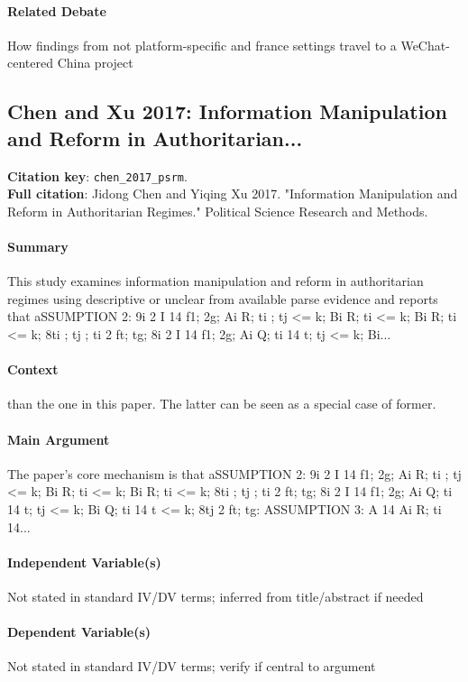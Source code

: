 \documentclass[12pt]{article}
\begin{document}
\paragraph{Related Debate} How findings from not platform-specific and france settings travel to a WeChat-centered China project


\subsection{Chen and Xu 2017: Information Manipulation and Reform in Authoritarian...}
\textbf{Citation key}: \texttt{chen\_2017\_psrm}.\\
\textbf{Full citation}: Jidong Chen and Yiqing Xu 2017. "Information Manipulation and Reform in Authoritarian Regimes." Political Science Research and Methods.

\paragraph{Summary} This study examines information manipulation and reform in authoritarian regimes using descriptive or unclear from available parse evidence and reports that aSSUMPTION 2: 9i 2 I 14 f1; 2g; Ai R; ti ; tj  <= k; Bi R; ti  <= k; Bi R; ti  <= k; 8ti ; tj ; ti 2 ft; tg; 8i 2 I 14 f1; 2g; Ai Q; ti 14 t; tj  <= k; Bi...

\paragraph{Context} than the one in this paper. The latter can be seen as a special case of former.

\paragraph{Main Argument} The paper's core mechanism is that aSSUMPTION 2: 9i 2 I 14 f1; 2g; Ai R; ti ; tj  <= k; Bi R; ti  <= k; Bi R; ti  <= k; 8ti ; tj ; ti 2 ft; tg; 8i 2 I 14 f1; 2g; Ai Q; ti 14 t; tj  <= k; Bi Q; ti 14 t <= k; 8tj 2 ft; tg: ASSUMPTION 3: A 14 Ai R; ti 14...

\paragraph{Independent Variable(s)} Not stated in standard IV/DV terms; inferred from title/abstract if needed

\paragraph{Dependent Variable(s)} Not stated in standard IV/DV terms; verify if central to argument
\end{document}
